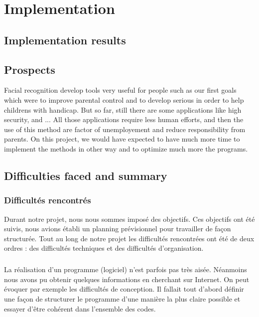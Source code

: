 \chapter{Implementation}



\section{Implementation results}
\section{Prospects}
Facial recognition develop tools very useful for people such as our first goals which were to improve parental control and to develop serious in order to help childrens with handicap. But so far, still there are some applications like high security, and ... All those applications require less human efforts, and then the use of this method are factor of unemployement and reduce responsibility from parents.
On this project, we would have expected to have much more time to implement the methods in other way and to optimize much more the programs.


\section{Difficulties faced and summary}
\subsection{Difficultés rencontrés}

Durant notre projet, nous nous sommes imposé des objectifs. Ces objectifs ont été suivis, nous avions établi un planning prévisionnel pour travailler de façon structurée. Tout au long de notre projet les difficultés rencontrées ont été de deux ordres : des difficultés techniques et des difficultés d'organisation.
\paragraph{} 
La réalisation d'un programme (logiciel) n'est parfois pas très aisée. Néanmoins nous avons pu obtenir quelques informations en cherchant sur Internet. 
On peut évoquer par exemple les difficultés de conception. Il fallait  tout d’abord définir une façon de structurer le programme d’une manière  la plus claire possible et essayer d'être cohérent dans l'ensemble des codes.
